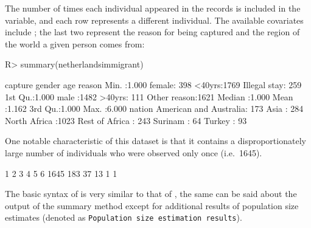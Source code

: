 \documentclass[
]{jss}
\newcommand{\1}{\mathcal{I}} \newcommand{\bZero}{\boldsymbol{0}}
\begin{document}
The number of times each individual appeared in the records is included
in the  variable, and each row represents a different
individual. The available covariates include
; the last two represent the reason
for being captured and the region of the world a given person comes
from:

\begin{CodeChunk}
\begin{CodeInput}
R> summary(netherlandsimmigrant)
\end{CodeInput}
\begin{CodeOutput}
    capture         gender         age                reason    
 Min.   :1.000   female: 398   <40yrs:1769   Illegal stay: 259  
 1st Qu.:1.000   male  :1482   >40yrs: 111   Other reason:1621  
 Median :1.000                                                  
 Mean   :1.162                                                  
 3rd Qu.:1.000                                                  
 Max.   :6.000                                                  
                    nation    
 American and Australia: 173  
 Asia                  : 284  
 North Africa          :1023  
 Rest of Africa        : 243  
 Surinam               :  64  
 Turkey                :  93  
\end{CodeOutput}
\end{CodeChunk}

One notable characteristic of this dataset is that it contains a
disproportionately large number of individuals who were observed only
once (i.e.~1645).

\begin{CodeChunk}
\begin{CodeOutput}

   1    2    3    4    5    6 
1645  183   37   13    1    1 
\end{CodeOutput}
\end{CodeChunk}

The basic syntax of  is very similar to that of
, the same can be said about the output of the summary method
except for additional results of population size estimates (denoted as
\texttt{Population size estimation results}).
\end{document}
